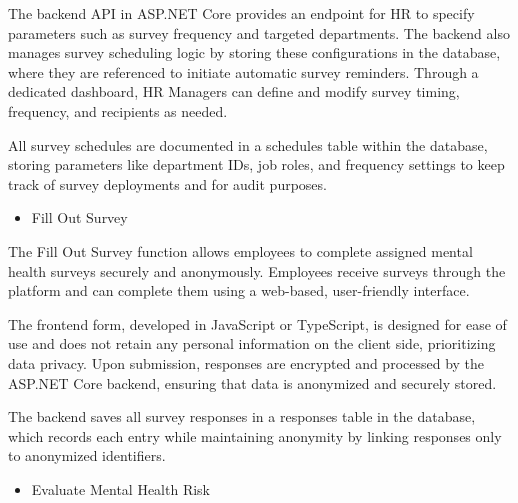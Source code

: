 \documentclass[conference]{IEEEtran}
\begin{document}
            The backend API in ASP.NET Core provides an endpoint for HR to 
            specify parameters such as survey frequency and targeted 
            departments. The backend also manages survey scheduling 
            logic by storing these configurations in the database, where 
            they are referenced to initiate automatic survey reminders. 
            Through a dedicated dashboard, HR Managers can define and 
            modify survey timing, frequency, and recipients as needed. 
            \newline
        
            All survey schedules are documented in a schedules table 
            within the database, storing parameters like department IDs, 
            job roles, and frequency settings to keep track of survey 
            deployments and for audit purposes.
            \newline
           
            \begin{itemize}
                \item Fill Out Survey 
            \end{itemize}
        
            The Fill Out Survey function allows employees to complete 
            assigned mental health surveys securely and anonymously. 
            Employees receive surveys through the platform and can complete them using a web-based, user-friendly interface. 
            \newline
            
            The frontend form, developed in JavaScript or TypeScript, is designed for ease of use and does not retain any personal information on the client side, prioritizing data privacy. Upon submission, responses are encrypted and processed by the ASP.NET Core backend, ensuring that data is anonymized and securely stored.
            \newline
        
            The backend saves all survey responses in a responses table in 
            the database, which records each entry while maintaining 
            anonymity by linking responses only to anonymized identifiers.
            \newline    
        
            \begin{itemize}
                \item Evaluate Mental Health Risk
            \end{itemize}
            
\end{document}
